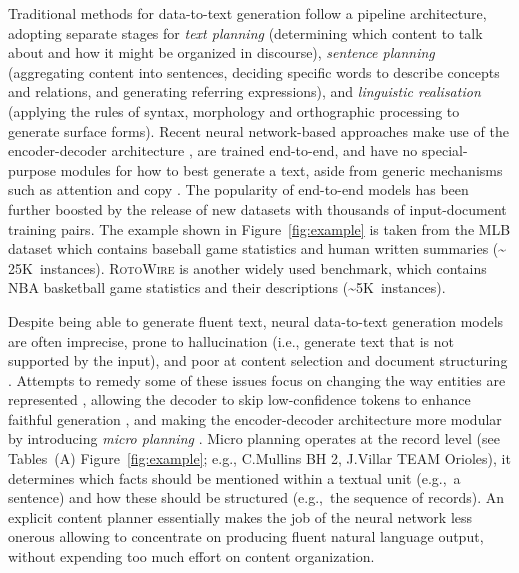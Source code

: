 \documentclass[11pt,a4paper]{article}
\newcommand{\lform}[1]{\textsf{\scriptsize{#1}}}
\begin{document}
Traditional methods for data-to-text generation
\cite{P83-1022,mckeown1992text,Reiter:1997:BAN:974487.974490} follow a
pipeline architecture, adopting separate stages for \emph{text
  planning} (determining which content to talk about and how it might
be organized in discourse), \emph{sentence planning} (aggregating
content into sentences, deciding specific words to describe concepts
and relations, and generating referring expressions), and
\emph{linguistic realisation} (applying the rules of syntax,
morphology and orthographic processing to generate surface forms).
Recent neural network-based approaches \cite{lebret-etal-2016-neural,
  mei-etal-2016-talk,wiseman-etal-2017-challenges} make use of the
encoder-decoder architecture \cite{sutskever2014sequence}, are trained
end-to-end, and have no special-purpose modules for how to best
generate a text, aside from generic mechanisms such as attention and
copy
\cite{DBLP:journals/corr/BahdanauCB14,gu-etal-2016-incorporating}. The
popularity of end-to-end models has been further boosted by the
release of new datasets with thousands of input-document training
pairs. The example shown in Figure~\ref{fig:example} is taken from the
MLB dataset \cite{puduppully-etal-2019-data} which contains baseball
game statistics and human written summaries (\textasciitilde
25K~instances).  \textsc{RotoWire} \cite{wiseman-etal-2017-challenges}
is another widely used benchmark, which contains NBA basketball game
statistics and their descriptions (\textasciitilde 5K~instances).

Despite being able to generate fluent text, neural data-to-text
generation models are often imprecise, prone to hallucination (i.e.,
generate text that is not supported by the input), and
poor at content selection and document structuring
\cite{wiseman-etal-2017-challenges}.
Attempts to remedy some of these issues focus on changing the way
entities are represented
\cite{puduppully-etal-2019-data,iso-etal-2019-learning}, allowing the
decoder to skip low-confidence tokens to enhance faithful generation
\cite{DBLP:journals/corr/abs-1910-08684}, and making the encoder-decoder architecture
more modular by introducing \emph{micro planning}
\cite{DBLP:journals/corr/abs-1809-00582,
  moryossef-etal-2019-step}. Micro planning operates at the record
level (see Tables~(A) Figure~\ref{fig:example}; e.g., \lform{\small
  C.Mullins BH 2}, \lform{\small J.Villar TEAM Orioles}), it
determines which facts should be mentioned within a textual unit
(e.g.,~a sentence) and how these should be structured (e.g.,~the
sequence of records). An explicit content planner essentially makes
the job of the neural network less onerous allowing to concentrate on
producing fluent natural language output, without expending too much
effort on content organization.
\end{document}
